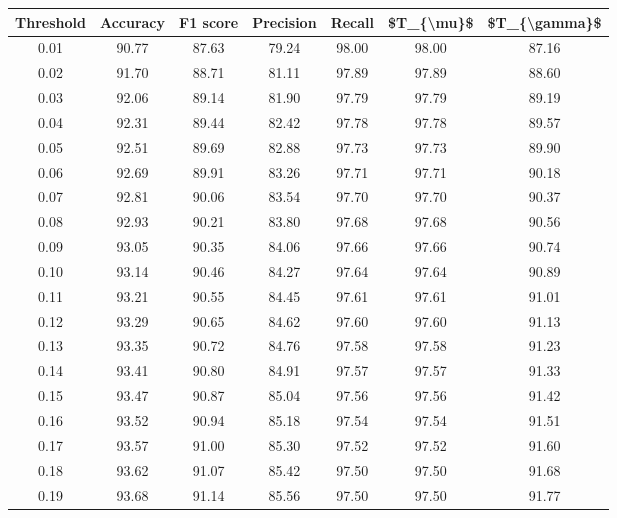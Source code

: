 \begin{tabular}{|c|c|c|c|c|c|c|}
\hline
 Threshold &  Accuracy &  F1 score &  Precision &  Recall &  \$T\_\{\textbackslash mu\}\$ &  \$T\_\{\textbackslash gamma\}\$ \\
\hline
      0.01 &     90.77 &     87.63 &      79.24 &   98.00 &      98.00 &         87.16 \\
      0.02 &     91.70 &     88.71 &      81.11 &   97.89 &      97.89 &         88.60 \\
      0.03 &     92.06 &     89.14 &      81.90 &   97.79 &      97.79 &         89.19 \\
      0.04 &     92.31 &     89.44 &      82.42 &   97.78 &      97.78 &         89.57 \\
      0.05 &     92.51 &     89.69 &      82.88 &   97.73 &      97.73 &         89.90 \\
      0.06 &     92.69 &     89.91 &      83.26 &   97.71 &      97.71 &         90.18 \\
      0.07 &     92.81 &     90.06 &      83.54 &   97.70 &      97.70 &         90.37 \\
      0.08 &     92.93 &     90.21 &      83.80 &   97.68 &      97.68 &         90.56 \\
      0.09 &     93.05 &     90.35 &      84.06 &   97.66 &      97.66 &         90.74 \\
      0.10 &     93.14 &     90.46 &      84.27 &   97.64 &      97.64 &         90.89 \\
      0.11 &     93.21 &     90.55 &      84.45 &   97.61 &      97.61 &         91.01 \\
      0.12 &     93.29 &     90.65 &      84.62 &   97.60 &      97.60 &         91.13 \\
      0.13 &     93.35 &     90.72 &      84.76 &   97.58 &      97.58 &         91.23 \\
      0.14 &     93.41 &     90.80 &      84.91 &   97.57 &      97.57 &         91.33 \\
      0.15 &     93.47 &     90.87 &      85.04 &   97.56 &      97.56 &         91.42 \\
      0.16 &     93.52 &     90.94 &      85.18 &   97.54 &      97.54 &         91.51 \\
      0.17 &     93.57 &     91.00 &      85.30 &   97.52 &      97.52 &         91.60 \\
      0.18 &     93.62 &     91.07 &      85.42 &   97.50 &      97.50 &         91.68 \\
      0.19 &     93.68 &     91.14 &      85.56 &   97.50 &      97.50 &         91.77 \\

\end{tabular}
